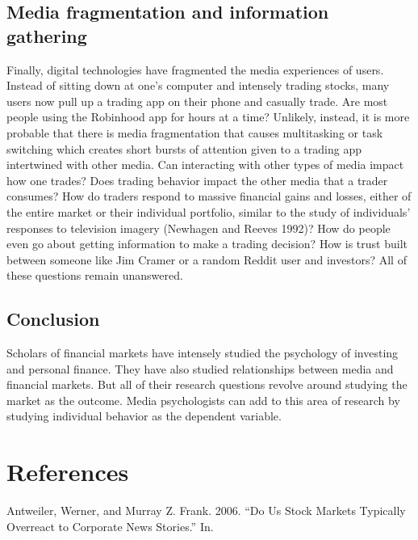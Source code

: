 \documentclass[12pt,]{article}
\begin{document}
\hypertarget{media-fragmentation-and-information-gathering}{%
\subsection{Media fragmentation and information
gathering}\label{media-fragmentation-and-information-gathering}}

Finally, digital technologies have fragmented the media experiences of
users. Instead of sitting down at one's computer and intensely trading
stocks, many users now pull up a trading app on their phone and casually
trade. Are most people using the Robinhood app for hours at a time?
Unlikely, instead, it is more probable that there is media fragmentation
that causes multitasking or task switching which creates short bursts of
attention given to a trading app intertwined with other media. Can
interacting with other types of media impact how one trades? Does
trading behavior impact the other media that a trader consumes? How do
traders respond to massive financial gains and losses, either of the
entire market or their individual portfolio, similar to the study of
individuals' responses to television imagery (Newhagen and Reeves 1992)?
How do people even go about getting information to make a trading
decision? How is trust built between someone like Jim Cramer or a random
Reddit user and investors? All of these questions remain unanswered.

\hypertarget{conclusion}{%
\subsection{Conclusion}\label{conclusion}}

Scholars of financial markets have intensely studied the psychology of
investing and personal finance. They have also studied relationships
between media and financial markets. But all of their research questions
revolve around studying the market as the outcome. Media psychologists
can add to this area of research by studying individual behavior as the
dependent variable.

\hypertarget{references}{%
\section*{References}\label{references}}

\hypertarget{refs}{}
\leavevmode\hypertarget{ref-antweiler2006}{}%
Antweiler, Werner, and Murray Z. Frank. 2006. ``Do Us Stock Markets
Typically Overreact to Corporate News Stories.'' In.
\end{document}
